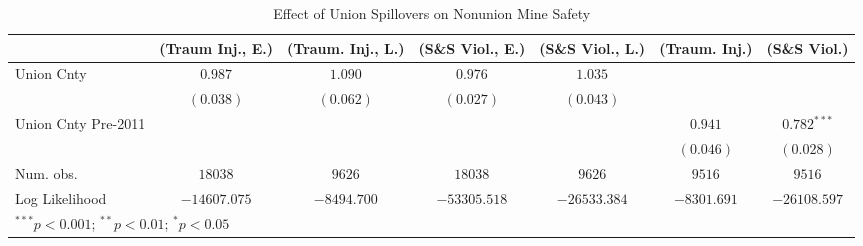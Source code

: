 
\begin{table}[H]
\begin{center}
\begin{tabular}{l c c c c c c}
\hline
 & (Traum Inj., E.) & (Traum. Inj., L.) & (S\&S Viol., E.) & (S\&S Viol., L.) & (Traum. Inj.) & (S\&S Viol.) \\
\hline
Union Cnty          & $0.987$      & $1.090$     & $0.976$      & $1.035$      &             &               \\
                    & $(0.038)$    & $(0.062)$   & $(0.027)$    & $(0.043)$    &             &               \\
Union Cnty Pre-2011 &              &             &              &              & $0.941$     & $0.782^{***}$ \\
                    &              &             &              &              & $(0.046)$   & $(0.028)$     \\
\hline
Num. obs.           & $18038$      & $9626$      & $18038$      & $9626$       & $9516$      & $9516$        \\
Log Likelihood      & $-14607.075$ & $-8494.700$ & $-53305.518$ & $-26533.384$ & $-8301.691$ & $-26108.597$  \\
\hline
\multicolumn{7}{l}{\scriptsize{$^{***}p<0.001$; $^{**}p<0.01$; $^{*}p<0.05$}}
\end{tabular}
\caption{Effect of Union Spillovers on Nonunion Mine Safety}
\label{irr_100employees_union_extern}
\end{center}
\end{table}

